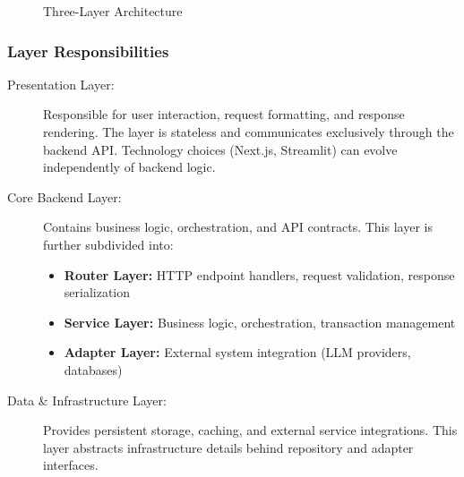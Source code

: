 \documentclass[a4paper,twoside]{sapthesis}
\begin{document}
\begin{figure}[htbp]
\centering
{}
\caption{Three-Layer Architecture}
\label{fig:three-layer}
\end{figure}

\subsubsection{Layer Responsibilities}

\begin{description}
    \item[Presentation Layer:] Responsible for user interaction, request formatting, and response rendering. The layer is stateless and communicates exclusively through the backend API. Technology choices (Next.js, Streamlit) can evolve independently of backend logic.
    
    \item[Core Backend Layer:] Contains business logic, orchestration, and API contracts. This layer is further subdivided into:
    \begin{itemize}
        \item \textbf{Router Layer:} HTTP endpoint handlers, request validation, response serialization
        \item \textbf{Service Layer:} Business logic, orchestration, transaction management
        \item \textbf{Adapter Layer:} External system integration (LLM providers, databases)
    \end{itemize}
    
    \item[Data \& Infrastructure Layer:] Provides persistent storage, caching, and external service integrations. This layer abstracts infrastructure details behind repository and adapter interfaces.
\end{description}
\end{document}

